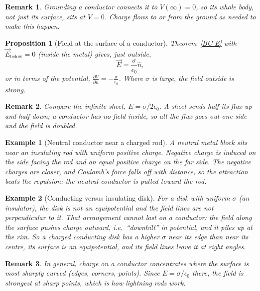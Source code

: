 \documentclass{article}
\newtheorem*{example}{Example}
\newtheorem{remark}{Remark}
\newtheorem{proposition}{Proposition}
\begin{document}
\begin{remark}
    Grounding a conductor connects it to $V(\infty) = 0$, so its whole body, not just its surface, sits at $V = 0$. Charge flows to or from the ground as needed to make this happen.
\end{remark}
\begin{proposition}[Field at the surface of a conductor]
    Theorem~\ref{BC-E} with $\vec{E}_{\text{below}} = 0$ (inside the metal) gives, just outside,
    \begin{equation}
        \vec{E} = \frac{\sigma}{\epsilon_0}\hat{n},
    \end{equation}
    or in terms of the potential, $\frac{\partial V}{\partial n} = -\frac{\sigma}{\epsilon_0}$. Where $\sigma$ is large, the field outside is strong.
\end{proposition}
\begin{remark}
    Compare the infinite sheet, $E = \sigma/2\epsilon_0$. A sheet sends half its flux up and half down; a conductor has no field inside, so all the flux goes out one side and the field is doubled.
\end{remark}
\begin{example}[Neutral conductor near a charged rod]
    A neutral metal block sits near an insulating rod with uniform positive charge. Negative charge is induced on the side facing the rod and an equal positive charge on the far side. The negative charges are closer, and Coulomb's force falls off with distance, so the attraction beats the repulsion: the neutral conductor is pulled toward the rod.
\end{example}
\begin{example}[Conducting versus insulating disk]
    For a disk with uniform $\sigma$ (an insulator), the disk is not an equipotential and the field lines are not perpendicular to it. That arrangement cannot last on a conductor: the field along the surface pushes charge outward, i.e.\ ``downhill'' in potential, and it piles up at the rim. So a charged conducting disk has a higher $\sigma$ near its edge than near its centre, its surface is an equipotential, and its field lines leave it at right angles.
\end{example}
\begin{remark}
    In general, charge on a conductor concentrates where the surface is most sharply curved (edges, corners, points). Since $E = \sigma/\epsilon_0$ there, the field is strongest at sharp points, which is how lightning rods work.
\end{remark}
\end{document}
